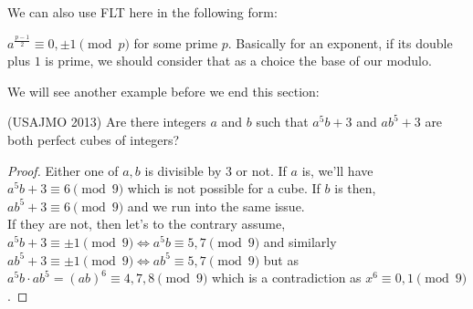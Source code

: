 We can also use FLT here in the following form:\\
\begin{theorem}
    $a^{\frac{p-1}{2}} \equiv 0,\pm 1 \pmod{p}$ for some prime $p$. Basically for an exponent, if its double plus $1$ is prime, we should consider that as a choice the base of our modulo.
\end{theorem}
We will see another example before we end this section:\\
\begin{example}
(USAJMO 2013)
Are there integers $a$ and $b$ such that $a^5b+3$ and $ab^5+3$ are both perfect cubes of integers?
\end{example}
\begin{proof}
    Either one of $a,b$ is divisible by $3$ or not. If $a$ is, we'll have $a^5b+3 \equiv 6 \pmod{9}$ which is not possible for a cube. If $b$ is then, $ab^5+3 \equiv 6 \pmod{9}$ and we run into the same issue.\\
    If they are not, then let's to the contrary assume, $a^5b+3 \equiv \pm 1 \pmod{9} \iff a^5b \equiv 5, 7 \pmod{9}$ and similarly $ab^5+3 \equiv \pm 1 \pmod{9} \iff ab^5 \equiv 5, 7 \pmod{9}$ but as $a^5b \cdot ab^5 = (ab)^6 \equiv 4,7,8 \pmod{9}$ which is a contradiction as $x^6 \equiv 0,1 \pmod{9}$.
\end{proof}
